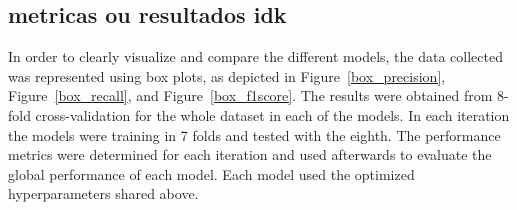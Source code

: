 \documentclass[conference]{IEEEtran}
\begin{document}
\subsection{metricas ou resultados idk}

In order to clearly visualize and compare the different models, the data collected was represented using box plots, as depicted in Figure~\ref{box_precision}, Figure~\ref{box_recall}, and Figure~\ref{box_f1score}.
The results were obtained from 8-fold cross-validation for the whole dataset in each of the models. In each iteration the models were training in 7 folds and tested with the eighth. The performance metrics were determined for each iteration and used afterwards to evaluate the global performance of each model. Each model used the optimized hyperparameters shared above.
\end{document}
